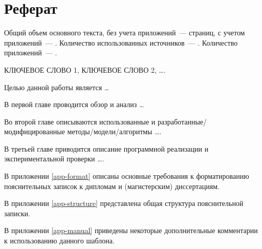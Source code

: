 \chapter*{Реферат}
\thispagestyle{plain}

Общий объем основного текста, без учета приложений~---
\pageref{end_of_main_text} страниц, с учетом приложений~---
\pageref{end_of_document}. Количество использованных источников~---
\hyperref[sec:bibliography]{}. Количество приложений~--- 
\hyperref[sec:appendices]{}.

\noindent \uppercase{ключевое слово 1, ключевое слово 2, \dots .}

Целью данной работы является \dots

В первой главе проводится обзор и анализ \dots 

Во второй главе описываются использованные и разработанные/модифицированные методы/модели/алгоритмы \dots. 

В третьей главе приводится описание программной реализации и экспериментальной проверки \dots.

В приложении \ref{app-format} описаны основные требования к форматированию пояснительных записок к дипломам и (магистерским) диссертациям.

В приложении \ref{app-structure} представлена общая структура пояснительной записки.

В приложении \ref{app-manual} приведены некоторые дополнительные комментарии к использованию данного шаблона.
